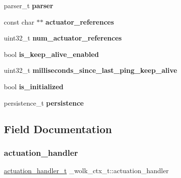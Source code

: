 \begin{DoxyCompactItemize}
\item 
\mbox{\label{struct__wolk__ctx__t_a75482b6b5f654f444aecd3ce133bcc8a}} 
parser\+\_\+t {\bfseries parser}
\item 
\mbox{\label{struct__wolk__ctx__t_a87d5e3b33fed53ef02c61111860fe929}} 
const char $\ast$$\ast$ {\bfseries actuator\+\_\+references}
\item 
\mbox{\label{struct__wolk__ctx__t_a3a96676f3cede3bd6f6e31d9cee30443}} 
uint32\+\_\+t {\bfseries num\+\_\+actuator\+\_\+references}
\item 
\mbox{\label{struct__wolk__ctx__t_a020de31835a1a0105cf149f2c66c4a1d}} 
bool {\bfseries is\+\_\+keep\+\_\+alive\+\_\+enabled}
\item 
\mbox{\label{struct__wolk__ctx__t_a1aa9fb2f10f0a9f2d7ca66734a28cd42}} 
uint32\+\_\+t {\bfseries milliseconds\+\_\+since\+\_\+last\+\_\+ping\+\_\+keep\+\_\+alive}
\item 
\mbox{\label{struct__wolk__ctx__t_a65aec58259024398da781689ad05799a}} 
bool {\bfseries is\+\_\+initialized}
\item 
\mbox{\label{struct__wolk__ctx__t_acedc150706ec304c5045f9c77b065ccd}} 
persistence\+\_\+t {\bfseries persistence}
\end{DoxyCompactItemize}


\subsection{Field Documentation}
\mbox{\label{struct__wolk__ctx__t_ac55ed80718abb1dca3027edda713ca57}} 
\subsubsection{\texorpdfstring{actuation\+\_\+handler}{actuation\_handler}}
{\footnotesize\ttfamily \hyperlink{WolkConn_8h_acde87869e807b1774680f3f2b5b04e2f}{actuation\+\_\+handler\+\_\+t} \+\_\+wolk\+\_\+ctx\+\_\+t\+::actuation\+\_\+handler}

